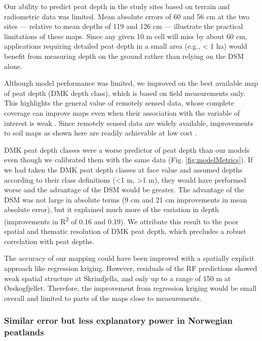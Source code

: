 \documentclass[soil, manuscript]{copernicus}
\begin{document}
Our ability to predict peat depth in the study sites based on terrain and radiometric data was limited.
Mean absolute errors of 60 and 56 cm at the two sites --- relative to mean depths of 119 and 126 cm --- illustrate the practical limitations of these maps.
Since any given 10 m cell will miss by about 60 cm, applications requiring detailed peat depth in a small area (e.g., \textless{} 1 ha) would benefit from measuring depth on the ground rather than relying on the DSM alone.

Although model performance was limited, we improved on the best available map of peat depth (DMK depth class), which is based on field measurements only.
This highlights the general value of remotely sensed data, whose complete coverage can improve maps even when their association with the variable of interest is weak \citep{mulderUseRemoteSensing2011}.
Since remotely sensed data are widely available, improvements to soil maps as shown here are readily achievable at low cost \citep{minasnyDigitalMappingPeatlands2019}.

DMK peat depth classes were a worse predictor of peat depth than our models even though we calibrated them with the same data (Fig. \ref{fig:modelMetrics}).
If we had taken the DMK peat depth classes at face value and assumed depths according to their class definitions (\textless1 m, \textgreater1 m), they would have performed worse and the advantage of the DSM would be greater.
The advantage of the DSM was not large in absolute terms (9 cm and 21 cm improvements in mean absolute error), but it explained much more of the variation in depth (improvements in R\textsuperscript{2} of 0.16 and 0.19).
We attribute this result to the poor spatial and thematic resolution of DMK peat depth, which precludes a robust correlation with peat depths.

The accuracy of our mapping could have been improved with a spatially explicit approach like regression kriging.
However, residuals of the RF predictions showed weak spatial structure at Skrimfjella, and only up to a range of 150 m at Ørskogfjellet.
Therefore, the improvement from regression kriging would be small overall and limited to parts of the maps close to measurements.

\subsubsection{Similar error but less explanatory power in Norwegian peatlands}
\end{document}
